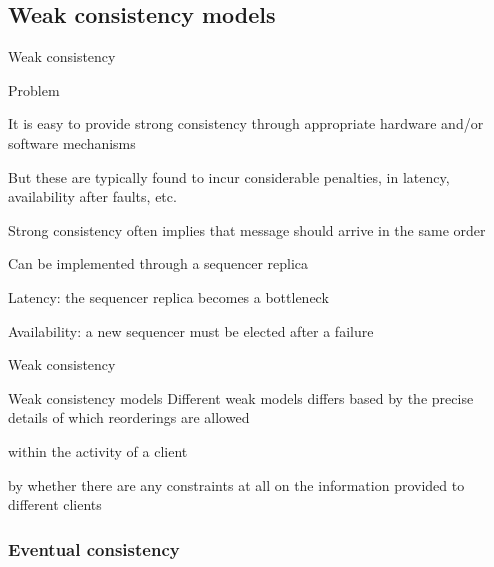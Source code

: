 \subsection{Weak consistency models}

\begin{frame}{Weak consistency}

\begin{block}{Problem}
\BI	
\item It is easy to provide strong consistency through  appropriate hardware and/or software mechanisms
\item But these are typically found to incur considerable penalties, in latency, availability after faults, etc.
\EI
\end{block}

\begin{example}
\BI
\item Strong consistency often implies that message should arrive in the same order
\item Can be implemented through a sequencer replica
\item Latency: the sequencer replica becomes a bottleneck
\item Availability: a new sequencer must be elected after a failure
\EI
\end{example}

\end{frame}

\begin{frame}{Weak consistency}
	
\begin{block}{Weak consistency models}
Different weak models differs based by the precise details of
which reorderings are allowed
\BI
\item within the activity of a client
\item by whether there are any constraints at all on the
information provided to different clients
\EI
\end{block}

\end{frame}

\subsubsection{Eventual consistency}

